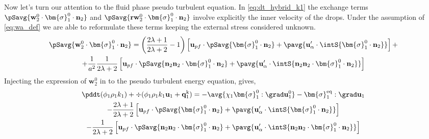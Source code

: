 Now let's turn our attention to the fluid phase pseudo turbulent equation. 
In  \ref{eq:dt_hybrid_k1} the exchange terms $\pSavg{\textbf{w}_2^0 \cdot \bm{\sigma}_1^0\cdot\textbf{n}_2}$ and  $\pSavg{\textbf{rw}_2^0 \cdot \bm{\sigma}_1^0\cdot\textbf{n}_2}$ involve explicitly the inner velocity of the drops.
Under the assumption of \ref{eq:wa_def} we are able to reformulate these terms keeping the external stress considered unknown.
\begin{multline*}
    \pSavg{\textbf{w}_2^0 \cdot \bm{\sigma}_1^0\cdot\textbf{n}_2}
    =  
    \left(\frac{2\lambda + 1}{2\lambda+2} - 1\right)\left[
        \textbf{u}_{p f}\cdot\pSavg{ \bm{\sigma}_1^0\cdot\textbf{n}_2}
        + \pavg{\textbf{u}_{\alpha}' \cdot \intS{ \bm{\sigma}_1^0\cdot\textbf{n}_2} }
    \right]
    + \\
    + \frac{1}{a^2}\frac{1}{2\lambda+2}\left[
        \textbf{u}_{p f} \cdot\pSavg{\textbf{n}_2\textbf{n}_2\cdot \bm{\sigma}_1^0\cdot\textbf{n}_2}
        +
        \pavg{\textbf{u}_{\alpha}' \cdot \intS{\textbf{n}_2\textbf{n}_2\cdot \bm{\sigma}_1^0\cdot\textbf{n}_2}}
    \right]
\end{multline*}
Injecting the expression of $\textbf{w}_2^0$ in to the pseudo turbulent energy equation, gives,
\begin{multline}
    \label{eq:dt_hybrid_k1_new}
    \pddt (\phi_1\rho_1k_1)  
    + \div (
        \phi_1\rho_1k_1\textbf{u}_1
        + \textbf{q}_1^\text{k} 
        )
    = 
    - \avg{\chi_1\bm{\sigma}_1^0 : \grad \textbf{u}_1^0}
    - \bm{\sigma}_1^\text{eq} : \grad \textbf{u}_1\\
    - \frac{2\lambda +1}{2\lambda +2} 
    \left[
        \textbf{u}_{pf}
        \cdot \pSavg{\bm{\sigma}_1^0 \cdot \textbf{n}_2}
        + \pavg{ \textbf{u}_\alpha' \cdot \intS{  \bm{\sigma}_1^0 \cdot \textbf{n}_2}}
    \right]\\
    - \frac{1}{2\lambda+2}\left[
        \textbf{u}_{p f} \cdot\pSavg{\textbf{n}_2\textbf{n}_2\cdot \bm{\sigma}_1^0\cdot\textbf{n}_2}
        +
        \pavg{\textbf{u}_{\alpha}' \cdot \intS{\textbf{n}_2\textbf{n}_2\cdot \bm{\sigma}_1^0\cdot\textbf{n}_2}}
    \right]
\end{multline}
